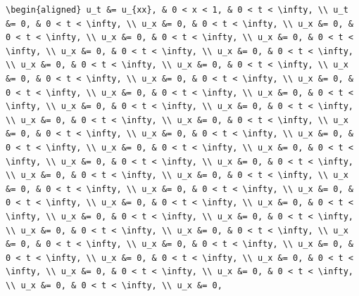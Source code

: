 \documentclass[
  ukrainian,
]{article}
\begin{document}
\begin{verbatim}
\begin{aligned} u_t &= u_{xx}, & 0 < x < 1, & 0 < t < \infty, \\ u_t &= 0, & 0 < t < \infty, \\ u_x &= 0, & 0 < t < \infty, \\ u_x &= 0, & 0 < t < \infty, \\ u_x &= 0, & 0 < t < \infty, \\ u_x &= 0, & 0 < t < \infty, \\ u_x &= 0, & 0 < t < \infty, \\ u_x &= 0, & 0 < t < \infty, \\ u_x &= 0, & 0 < t < \infty, \\ u_x &= 0, & 0 < t < \infty, \\ u_x &= 0, & 0 < t < \infty, \\ u_x &= 0, & 0 < t < \infty, \\ u_x &= 0, & 0 < t < \infty, \\ u_x &= 0, & 0 < t < \infty, \\ u_x &= 0, & 0 < t < \infty, \\ u_x &= 0, & 0 < t < \infty, \\ u_x &= 0, & 0 < t < \infty, \\ u_x &= 0, & 0 < t < \infty, \\ u_x &= 0, & 0 < t < \infty, \\ u_x &= 0, & 0 < t < \infty, \\ u_x &= 0, & 0 < t < \infty, \\ u_x &= 0, & 0 < t < \infty, \\ u_x &= 0, & 0 < t < \infty, \\ u_x &= 0, & 0 < t < \infty, \\ u_x &= 0, & 0 < t < \infty, \\ u_x &= 0, & 0 < t < \infty, \\ u_x &= 0, & 0 < t < \infty, \\ u_x &= 0, & 0 < t < \infty, \\ u_x &= 0, & 0 < t < \infty, \\ u_x &= 0, & 0 < t < \infty, \\ u_x &= 0, & 0 < t < \infty, \\ u_x &= 0, & 0 < t < \infty, \\ u_x &= 0, & 0 < t < \infty, \\ u_x &= 0, & 0 < t < \infty, \\ u_x &= 0, & 0 < t < \infty, \\ u_x &= 0, & 0 < t < \infty, \\ u_x &= 0, & 0 < t < \infty, \\ u_x &= 0, & 0 < t < \infty, \\ u_x &= 0, & 0 < t < \infty, \\ u_x &= 0, & 0 < t < \infty, \\ u_x &= 0, & 0 < t < \infty, \\ u_x &= 0, & 0 < t < \infty, \\ u_x &= 0, & 0 < t < \infty, \\ u_x &= 0, & 0 < t < \infty, \\ u_x &= 0, & 0 < t < \infty, \\ u_x &= 0, 
\end{verbatim}
\end{document}
